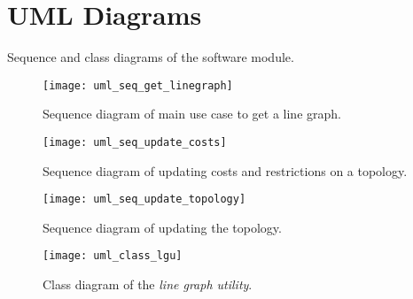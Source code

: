 \documentclass[../main.tex]{subfiles}
\begin{document}
\chapter{UML Diagrams}\label{appendix-uml_diagrams}
Sequence and class diagrams of the software module.

\vspace{2em}

\begin{figure}[h]
    \centering
    \texttt{[image: uml\_seq\_get\_linegraph]}
    \caption{Sequence diagram of main use case to get a line graph.}
    \label{fig:appendix_uml_seq_get_linegraph}
\end{figure}

\clearpage
\begin{figure}[H]
    \centering
    \texttt{[image: uml\_seq\_update\_costs]}
    \caption{Sequence diagram of updating costs and restrictions on a topology.}
    \label{fig:appendix_uml_seq_update_costs}
\end{figure}

\clearpage
\begin{figure}[H]
    \centering
    \texttt{[image: uml\_seq\_update\_topology]}
    \caption{Sequence diagram of updating the topology.}
    \label{fig:appendix_uml_seq_update_topology}
\end{figure}

\clearpage
\begin{sidewaysfigure}[h!]
    \centering
    \texttt{[image: uml\_class\_lgu]}
    \caption{Class diagram of the \textit{line graph utility}.}
    \label{fig:appendix_uml_class_lgu}
\end{sidewaysfigure}
\end{document}
